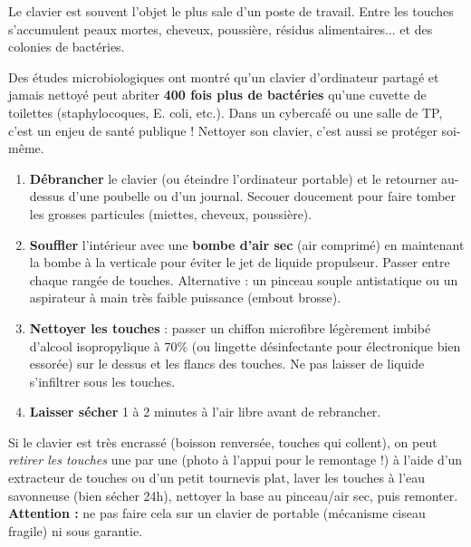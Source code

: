 \documentclass[11pt]{article}
\newcounter{popsec}
\newcounter{popsub}
\newcommand{\courssub}[1]{%
  \stepcounter{popsub}%
  \par\vspace{9pt}\noindent{\popxbold\fontsize{11.5}{13}\selectfont\color{popink}{\color{poporange}\thepopsec.\thepopsub}\hspace{6pt}#1}\par\nopagebreak\vspace{4pt}
}
\begin{document}
\courssub{Nettoyage du clavier : le nid à microbes}

Le clavier est souvent l'objet le plus sale d'un poste de travail. Entre les touches s'accumulent peaux mortes, cheveux, poussière, résidus alimentaires... et des colonies de bactéries.

\begin{savaistu}
Des études microbiologiques ont montré qu'un clavier d'ordinateur partagé et jamais nettoyé peut abriter \textbf{400 fois plus de bactéries} qu'une cuvette de toilettes (staphylocoques, E. coli, etc.). Dans un cybercafé ou une salle de TP, c'est un enjeu de santé publique ! Nettoyer son clavier, c'est aussi se protéger soi-même.
\end{savaistu}

\begin{methode}
\begin{enumerate}
    \item \textbf{Débrancher} le clavier (ou éteindre l'ordinateur portable) et le retourner au-dessus d'une poubelle ou d'un journal. Secouer doucement pour faire tomber les grosses particules (miettes, cheveux, poussière).
    \item \textbf{Souffler} l'intérieur avec une \textbf{bombe d'air sec} (air comprimé) en maintenant la bombe à la verticale pour éviter le jet de liquide propulseur. Passer entre chaque rangée de touches. Alternative : un pinceau souple antistatique ou un aspirateur à main très faible puissance (embout brosse).
    \item \textbf{Nettoyer les touches} : passer un chiffon microfibre légèrement imbibé d'alcool isopropylique à 70\% (ou lingette désinfectante pour électronique bien essorée) sur le dessus et les flancs des touches. Ne pas laisser de liquide s'infiltrer sous les touches.
    \item \textbf{Laisser sécher} 1 à 2 minutes à l'air libre avant de rebrancher.
\end{enumerate}
\end{methode}

\begin{exemplebox}
Si le clavier est très encrassé (boisson renversée, touches qui collent), on peut \emph{retirer les touches} une par une (photo à l'appui pour le remontage !) à l'aide d'un extracteur de touches ou d'un petit tournevis plat, laver les touches à l'eau savonneuse (bien sécher 24h), nettoyer la base au pinceau/air sec, puis remonter. \textbf{Attention :} ne pas faire cela sur un clavier de portable (mécanisme ciseau fragile) ni sous garantie.
\end{exemplebox}
\end{document}
